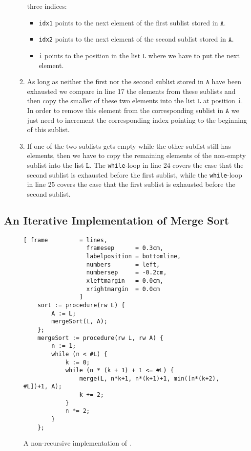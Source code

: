 \begin{enumerate}
\begin{enumerate}
            three indices: 
            \begin{itemize}
            \item \texttt{idx1} points to the next element of the first sublist stored in $\mathtt{A}$.
            \item \texttt{idx2} points to the next element of the second sublist stored in $\mathtt{A}$.
            \item \texttt{i} points to the position in the list $\mathtt{L}$ where we have to put the next
                       element.
            \end{itemize}
      \item As long as neither the first nor the second sublist stored in $\mathtt{A}$ have been exhausted
            we compare in line 17 the elements from these sublists and then copy the smaller of these
            two elements into the list $\mathtt{L}$ at position \texttt{i}.
            In order to remove this element from the corresponding sublist in $\mathtt{A}$ we just need to
            increment the corresponding index pointing to the beginning of this sublist.
      \item If one of the two sublists gets empty while the other sublist still has elements, then we have
            to copy the remaining elements of the non-empty sublist into the list $\mathtt{L}$.
            The \texttt{while}-loop in line 24 covers the case that the second sublist is exhausted before 
            the first sublist, while the \texttt{while}-loop in line 25 covers the case that the first
            sublist is exhausted before the second sublist.
      \end{enumerate}
\end{enumerate}

\subsection{An Iterative Implementation of Merge Sort}

\begin{figure}[!ht]
  \centering
\begin{Verbatim}[ frame         = lines, 
                  framesep      = 0.3cm, 
                  labelposition = bottomline,
                  numbers       = left,
                  numbersep     = -0.2cm,
                  xleftmargin   = 0.0cm,
                  xrightmargin  = 0.0cm
                ]
    sort := procedure(rw L) {
        A := L;
        mergeSort(L, A);
    };
    mergeSort := procedure(rw L, rw A) {
        n := 1;
        while (n < #L) {
            k := 0;
            while (n * (k + 1) + 1 <= #L) {
                merge(L, n*k+1, n*(k+1)+1, min([n*(k+2), #L])+1, A);
                k += 2;    
            }
            n *= 2;
        }
    };
\end{Verbatim}
\vspace*{-0.3cm}
  \caption{A non-recursive implementation of .}
  \label{fig:merge-sort-nr.stlx}
\end{figure}

